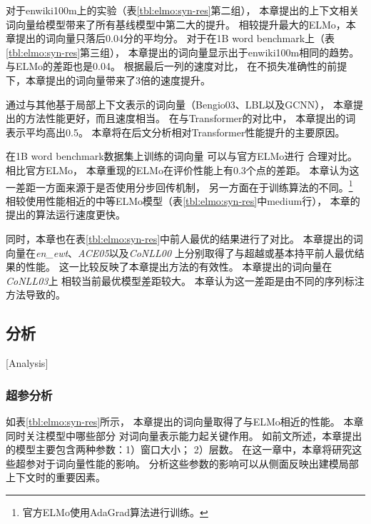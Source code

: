 对于enwiki100m上的实验（表\ref{tbl:elmo:syn-res}第二组），
本章提出的上下文相关词向量给模型带来了所有基线模型中第二大的提升。
相较提升最大的ELMo，本章提出的词向量只落后0.04分的平均分。
对于在1B word benchmark上（表\ref{tbl:elmo:syn-res}第三组），
本章提出的词向量显示出于enwiki100m相同的趋势。
与ELMo的差距也是0.04。
根据最后一列的速度对比，
在不损失准确性的前提下，本章提出的词向量带来了3倍的速度提升。

通过与其他基于局部上下文表示的词向量（Bengio03、LBL以及GCNN），
本章提出的方法性能更好，而且速度相当。
在与Transformer的对比中，
本章提出的词表示平均高出0.5。
本章将在后文分析相对Transformer性能提升的主要原因。

在1B word benchmark数据集上训练的词向量
可以与官方ELMo\cite{peters-EtAl:2018:N18-1}进行
合理对比。
相比官方ELMo，
本章重现的ELMo在评价性能上有0.3个点的差距。
本章认为这一差距一方面来源于是否使用分步回传机制，
另一方面在于训练算法的不同。\footnote{官方ELMo使用AdaGrad算法进行训练。}
相较使用性能相近的中等ELMo模型（表\ref{tbl:elmo:syn-res}中medium行），
本章的提出的算法运行速度更快。

同时，本章也在表\ref{tbl:elmo:syn-res}中前人最优的结果进行了对比。
本章提出的词向量在\textit{en\_ewt}、\textit{ACE05}以及\textit{CoNLL00}
上分别取得了与超越或基本持平前人最优结果的性能。
这一比较反映了本章提出方法的有效性。
本章提出的词向量在\textit{CoNLL03}上
相较当前最优模型差距较大。
本章认为这一差距是由不同的序列标注方法导致的。

\subsection{分析}[Analysis]\label{sec:elmo:ana}

\subsubsection{超参分析}
如表\ref{tbl:elmo:syn-res}所示，
本章提出的词向量取得了与ELMo相近的性能。
本章同时关注模型中哪些部分
对词向量表示能力起关键作用。
如前文所述，本章提出的模型主要包含两种参数：1）窗口大小；
2）层数。
在这一章中，本章将研究这些超参对于词向量性能的影响。
分析这些参数的影响可以从侧面反映出建模局部上下文时的重要因素。

